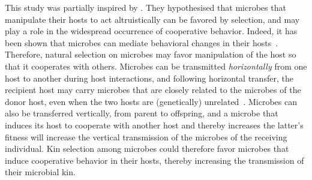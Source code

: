 \documentclass[12pt]{extarticle}
\begin{document}
{This study was partially inspired by \citet{lewin2017microbes}. 
They hypothesised that microbes that manipulate their hosts to act altruistically can be favored by selection, and may play a role in the widespread occurrence of cooperative behavior. Indeed, it has been shown that microbes can mediate behavioral changes in their hosts~\citep{dobson1988population,poulin2010parasite}. Therefore, natural selection on microbes may favor manipulation of the host so that it cooperates with others. Microbes can be transmitted \emph{horizontally} from one host to another during host interactions, and following horizontal transfer, the recipient host may carry microbes that are closely related to the microbes of the donor host, even when the two hosts are (genetically) unrelated~\citep{lewin2017microbes}. Microbes can also be transferred vertically, from parent to offspring, and %
a microbe that induces its host to cooperate with another host and thereby increases the latter's fitness will  increase the vertical transmission of the microbes of the receiving individual. Kin selection among microbes could therefore favor microbes that induce cooperative behavior in their hosts, thereby increasing the transmission of their microbial kin.


}
\end{document}
